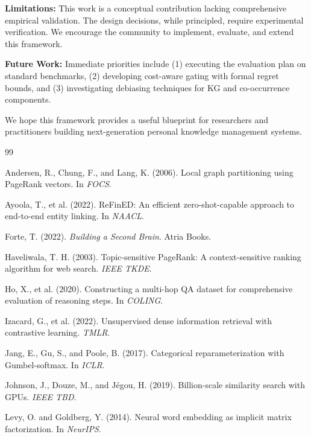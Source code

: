 \documentclass[11pt,a4paper]{article}
\begin{document}
\textbf{Limitations:} This work is a conceptual contribution lacking comprehensive empirical validation. The design decisions, while principled, require experimental verification. We encourage the community to implement, evaluate, and extend this framework.

\textbf{Future Work:} Immediate priorities include (1) executing the evaluation plan on standard benchmarks, (2) developing cost-aware gating with formal regret bounds, and (3) investigating debiasing techniques for KG and co-occurrence components.

We hope this framework provides a useful blueprint for researchers and practitioners building next-generation personal knowledge management systems.


\begin{thebibliography}{99}

Andersen, R., Chung, F., and Lang, K. (2006).
Local graph partitioning using PageRank vectors.
In \textit{FOCS}.

Ayoola, T., et al. (2022).
ReFinED: An efficient zero-shot-capable approach to end-to-end entity linking.
In \textit{NAACL}.

Forte, T. (2022).
\textit{Building a Second Brain}.
Atria Books.

Haveliwala, T. H. (2003).
Topic-sensitive PageRank: A context-sensitive ranking algorithm for web search.
\textit{IEEE TKDE}.

Ho, X., et al. (2020).
Constructing a multi-hop QA dataset for comprehensive evaluation of reasoning steps.
In \textit{COLING}.

Izacard, G., et al. (2022).
Unsupervised dense information retrieval with contrastive learning.
\textit{TMLR}.

Jang, E., Gu, S., and Poole, B. (2017).
Categorical reparameterization with Gumbel-softmax.
In \textit{ICLR}.

Johnson, J., Douze, M., and Jégou, H. (2019).
Billion-scale similarity search with GPUs.
\textit{IEEE TBD}.

Levy, O. and Goldberg, Y. (2014).
Neural word embedding as implicit matrix factorization.
In \textit{NeurIPS}.


\end{thebibliography}
\end{document}
